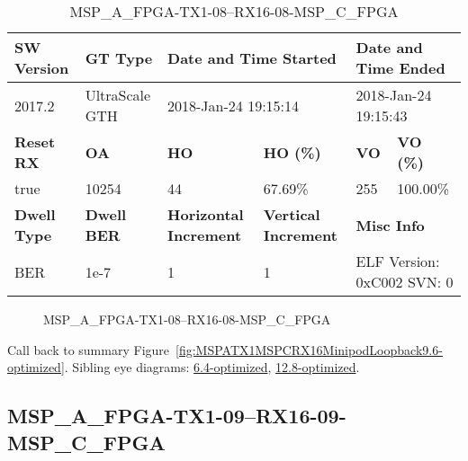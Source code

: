\begin{table}[h]
\centering
\caption{MSP\_A\_FPGA-TX1-08--RX16-08-MSP\_C\_FPGA}
\label{tab:MSPAFPGATX108RX1608MSPCFPGA9.6-optimized}
\begin{tabular}{@{}|l|l|l|l|l|l|@{}}
\toprule
\textbf{SW Version}                & \textbf{GT Type}   & \multicolumn{2}{l|}{\textbf{Date and Time Started}}            & \multicolumn{2}{l|}{\textbf{Date and Time Ended}}        \\ \midrule
2017.2                       & UltraScale GTH          & \multicolumn{2}{l|}{2018-Jan-24 19:15:14}                   & \multicolumn{2}{l|}{2018-Jan-24 19:15:43}               \\ \midrule
\textbf{Reset RX}                  & \textbf{OA} & \textbf{HO}   & \textbf{HO (\%)} & \textbf{VO} & \textbf{VO (\%)} \\ \midrule
true & 10254        & 44          & 67.69\%        & 255        & 100.00\%       \\ \midrule
\textbf{Dwell Type}                & \textbf{Dwell BER} & \textbf{Horizontal Increment} & \textbf{Vertical Increment}    & \multicolumn{2}{l|}{\textbf{Misc Info}}                  \\ \midrule
BER                            & 1e-7        & 1        & 1           & \multicolumn{2}{l|}{ELF Version: 0xC002 SVN: 0}                         \\ \bottomrule
\end{tabular}
\end{table}

\begin{figure}[h]
\caption{MSP\_A\_FPGA-TX1-08--RX16-08-MSP\_C\_FPGA} \label{fig:MSPAFPGATX108RX1608MSPCFPGA9.6-optimized}
\end{figure}

Call back to summary Figure~\ref{fig:MSPATX1MSPCRX16MinipodLoopback9.6-optimized}.
Sibling eye diagrams: \hyperref[sec:MSPAFPGATX108RX1608MSPCFPGA6.4-optimized]{6.4-optimized}, \hyperref[sec:MSPAFPGATX108RX1608MSPCFPGA12.8-optimized]{12.8-optimized}.

\clearpage
\newpage


\subsection{MSP\_A\_FPGA-TX1-09--RX16-09-MSP\_C\_FPGA}\label{sec:MSPAFPGATX109RX1609MSPCFPGA9.6-optimized}

